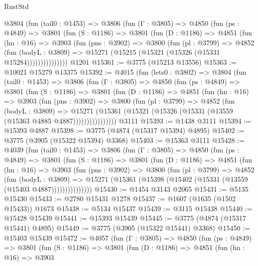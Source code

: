 \begin{lexlean}{RustStd}
\begin{coremodule}
      @3804
        (fun (tail0 : @1453) =>
        @3806
          (fun (Γ : @3805) =>
          @4850
            (fun (ps : @4849) =>
            @3801
              (fun (S : @1186) =>
              @3801
                (fun (D : @1186) =>
                @4851
                  (fun (hn : @16) =>
                  @3903
                    (fun (pns : @3902) =>
                    @3800
                      (fun (pl : @3799) =>
                      @4852
                        (fun (bodyL : @3809) =>
                        @15271 (@15215 (@15321 (@15326 (@15331 @15284)))))))))))))))
    @1201
@15361 := @3775 (@15213 @13556)
@15363 := @10021 @15279 @13375
@15392 := @4015
    (fun (lets0 : @3802) =>
    @3804
      (fun (tail0 : @1453) =>
      @3806
        (fun (Γ : @3805) =>
        @4850
          (fun (ps : @4849) =>
          @3801
            (fun (S : @1186) =>
            @3801
              (fun (D : @1186) =>
              @4851
                (fun (hn : @16) =>
                @3903
                  (fun (pns : @3902) =>
                  @3800
                    (fun (pl : @3799) =>
                    @4852
                      (fun (bodyL : @3809) =>
                      @15271
                        (@15361 (@15321 (@15326 (@15331 (@13559 (@15363 @4885 @4887))))))))))))))))
    @3111
@15393 := @1438 @3111
@15394 := @15393 @4887
@15398 := @3775 (@4874 (@15317 @15394) @4895)
@15402 := @3775 (@3905 (@15322 @15394) @3368)
@15403 := @15363 @3111
@15428 := @4039
    (fun (tail0 : @1453) =>
    @3806
      (fun (Γ : @3805) =>
      @4850
        (fun (ps : @4849) =>
        @3801
          (fun (S : @1186) =>
          @3801
            (fun (D : @1186) =>
            @4851
              (fun (hn : @16) =>
              @3903
                (fun (pns : @3902) =>
                @3800
                  (fun (pl : @3799) =>
                  @4852
                    (fun (bodyL : @3809) =>
                    @15271 (@15361 (@15398 (@15402 (@15331 (@13559 (@15403 @4887)))))))))))))))
@15430 := @1454 @3143 @2065
@15431 := @5135 @15430
@15433 := @2780 @15431 @1278
@15437 := @1607 (@1635 (@1502 @15433)) @1673
@15438 := @5134 @15437
@15439 := @3115 @15438
@15440 := @15428 @15439
@15441 := @15393 @15439
@15445 := @3775 (@4874 (@15317 @15441) @4895)
@15449 := @3775 (@3905 (@15322 @15441) @3368)
@15450 := @15403 @15439
@15472 := @4057
    (fun (Γ : @3805) =>
    @4850
      (fun (ps : @4849) =>
      @3801
        (fun (S : @1186) =>
        @3801
          (fun (D : @1186) =>
          @4851
            (fun (hn : @16) =>
            @3903

\end{coremodule}
\end{lexlean}
